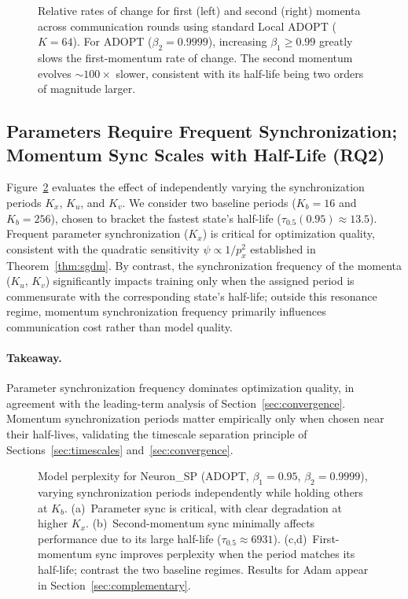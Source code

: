 \documentclass{article}
\begin{document}
\begin{figure}[t]
\centering
\caption{Relative rates of change for first (left) and second (right)
momenta across communication rounds using standard Local ADOPT
($K = 64$). For ADOPT ($\beta_2 = 0.9999$), increasing
$\beta_1 \geq 0.99$ greatly slows the first-momentum rate of change.
The second momentum evolves ${\sim}100\times$ slower, consistent with
its half-life being two orders of magnitude larger.}
\label{fig:rates_of_change}
\end{figure}

\subsection{Parameters Require Frequent Synchronization; Momentum Sync
Scales with Half-Life (RQ2)}
\label{sec:rq2}

Figure~\ref{fig:sync_freq} evaluates the effect of independently varying
the synchronization periods $K_x$, $K_u$, and $K_v$. We consider two
baseline periods ($K_b = 16$ and $K_b = 256$), chosen to bracket the
fastest state's half-life ($\tau_{0.5}(0.95) \approx 13.5$). Frequent
parameter synchronization ($K_x$) is critical for optimization quality,
consistent with the quadratic sensitivity $\psi \propto 1/p_x^2$
established in Theorem~\ref{thm:sgdm}. By contrast, the synchronization
frequency of the momenta ($K_u$, $K_v$) significantly impacts training
only when the assigned period is commensurate with the corresponding
state's half-life; outside this resonance regime, momentum synchronization
frequency primarily influences communication cost rather than model quality.

\paragraph{Takeaway.}
Parameter synchronization frequency dominates optimization quality,
in agreement with the leading-term analysis of
Section~\ref{sec:convergence}. Momentum synchronization periods matter
empirically only when chosen near their half-lives, validating the
timescale separation principle of Sections~\ref{sec:timescales}
and~\ref{sec:convergence}.

\begin{figure}[t]
\centering
\caption{Model perplexity for Neuron\_SP (ADOPT,
$\beta_1 = 0.95$, $\beta_2 = 0.9999$), varying synchronization periods
independently while holding others at $K_b$. (a)~Parameter sync is
critical, with clear degradation at higher $K_x$.
(b)~Second-momentum sync minimally affects performance due to its large
half-life ($\tau_{0.5} \approx 6931$). (c,d)~First-momentum sync improves
perplexity when the period matches its half-life; contrast the two
baseline regimes. Results for Adam appear in
Section~\ref{sec:complementary}.}
\label{fig:sync_freq}
\end{figure}
\end{document}
